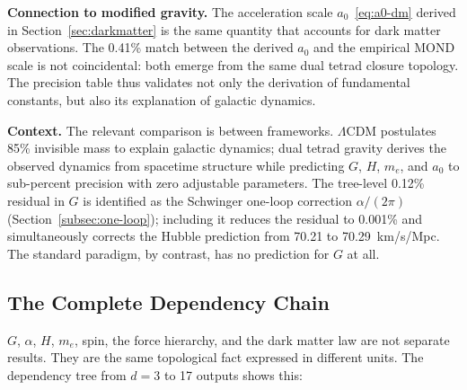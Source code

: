 \documentclass[aps,prd,preprint,superscriptaddress,showpacs,preprintnumbers,amsmath,amssymb,nofootinbib]{revtex4-2}
\begin{document}
\textbf{Connection to modified gravity.} The acceleration scale $a_0$~\eqref{eq:a0-dm} derived in Section~\ref{sec:darkmatter} is the same quantity that accounts for dark matter observations. The 0.41\% match between the derived $a_0$ and the empirical MOND scale is not coincidental: both emerge from the same dual tetrad closure topology. The precision table thus validates not only the derivation of fundamental constants, but also its explanation of galactic dynamics.

\textbf{Context.} The relevant comparison is between frameworks. $\Lambda$CDM postulates 85\% invisible mass to explain galactic dynamics; dual tetrad gravity derives the observed dynamics from spacetime structure while predicting $G$, $H$, $m_e$, and $a_0$ to sub-percent precision with zero adjustable parameters. The tree-level 0.12\% residual in $G$ is identified as the Schwinger one-loop correction $\alpha/(2\pi)$ (Section~\ref{subsec:one-loop}); including it reduces the residual to 0.001\% and simultaneously corrects the Hubble prediction from 70.21 to 70.29~km/s/Mpc. The standard paradigm, by contrast, has no prediction for $G$ at all.

\subsection{The Complete Dependency Chain}
\label{subsec:dependency}

$G$, $\alpha$, $H$, $m_e$, spin, the force hierarchy, and the dark matter law are not separate results. They are the same topological fact expressed in different units. The dependency tree from $d = 3$ to 17 outputs shows this:
\end{document}
